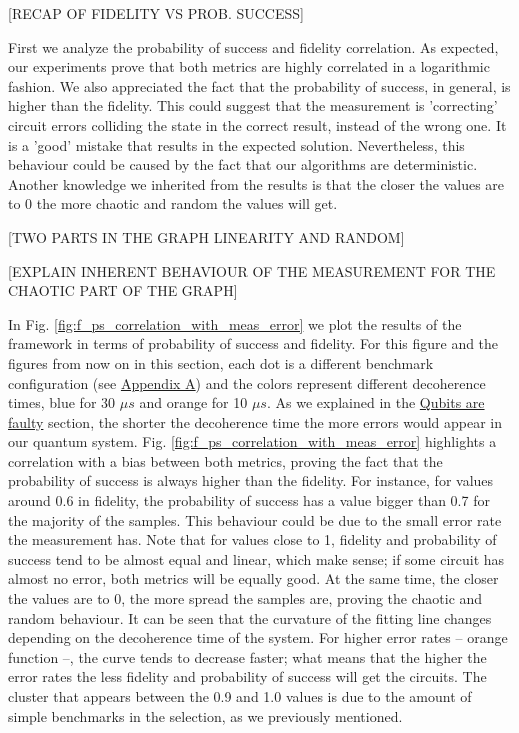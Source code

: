 [RECAP OF FIDELITY VS PROB. SUCCESS]

First we analyze the probability of success and fidelity correlation.
As expected, our experiments prove that both metrics are highly correlated in a logarithmic fashion.
We also appreciated the fact that the probability of success, in general, is higher than the fidelity.
This could suggest that the measurement is 'correcting' circuit errors colliding the state in the correct result, instead of the wrong one.
It is a 'good' mistake that results in the expected solution.
Nevertheless, this behaviour could be caused by the fact that our algorithms are deterministic.
Another knowledge we inherited from the results is that the closer the values are to 0 the more chaotic and random the values will get.



[TWO PARTS IN THE GRAPH  LINEARITY AND RANDOM]

[EXPLAIN INHERENT BEHAVIOUR OF THE MEASUREMENT FOR THE CHAOTIC PART OF THE GRAPH]

In Fig. \ref{fig:f_ps_correlation_with_meas_error} we plot the results of the framework in terms of probability of success and fidelity. 
For this figure and the figures from now on in this section, each dot is a different benchmark configuration (see \href{appendix-1.org}{Appendix A}) and the colors represent different decoherence times, blue for 30 \(\mu s\) and orange for 10 \(\mu s\).
As we explained in the \href{quantum_computing.org}{Qubits are faulty} section, the shorter the decoherence time the more errors would appear in our quantum system.
Fig. \ref{fig:f_ps_correlation_with_meas_error} highlights a correlation with a bias between both metrics, proving the fact that the probability of success is always higher than the fidelity.
For instance, for values around 0.6 in fidelity, the probability of success has a value bigger than 0.7 for the majority of the samples.
This behaviour could be due to the small error rate the measurement has.
Note that for values close to 1, fidelity and probability of success tend to be almost equal and linear, which make sense; if some circuit has almost no error, both metrics will be equally good.
At the same time, the closer the values are to 0, the more spread the samples are, proving the chaotic and random behaviour.
It can be seen that the curvature of the fitting line changes depending on the decoherence time of the system.
For higher error rates -- orange function --, the curve tends to decrease faster; what means that the higher the error rates the less fidelity and probability of success will get the circuits.
The cluster that appears between the 0.9 and 1.0 values is due to the amount of simple benchmarks in the selection, as we previously mentioned.

